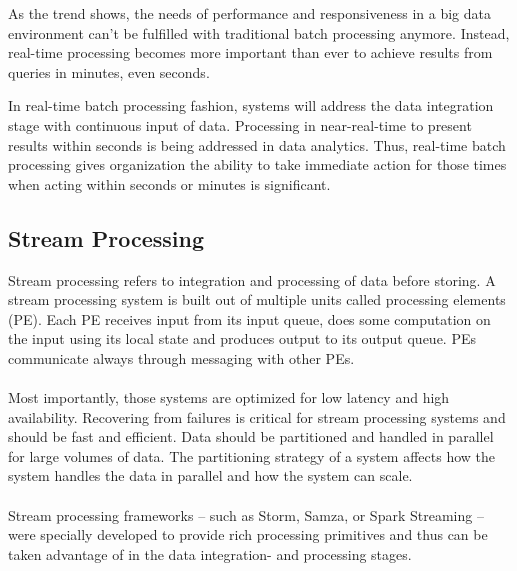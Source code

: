 As the trend shows, the needs of performance and responsiveness in a big data
environment can't be fulfilled with traditional batch processing anymore.
Instead, real-time processing becomes more important than ever to achieve
results from queries in minutes, even seconds.
\cite{bange2013big}

In real-time batch processing fashion, systems will address the data integration stage
with continuous input of data. Processing in near-real-time to present 
results within seconds is being addressed in data analytics. Thus,
real-time batch processing gives organization the ability to take immediate action
for those times when acting within seconds or minutes is significant.
\cite{PrpSvyOfDSPS}


\subsection{Stream Processing}
\label{intro-datastream-streamprocessing}
Stream processing refers to integration and processing of data before storing. 
A stream processing system is built out of multiple units called processing
elements (PE). Each PE receives input from its input queue, does some
computation on the input using its local state and produces output to its
output queue. PEs communicate always through messaging with other PEs. 
\\ \\
Most importantly, those systems are optimized for low latency and high
availability. Recovering from failures is critical for stream processing
systems and should be fast and efficient. 
Data should be partitioned and handled in parallel for large volumes of data. 
The partitioning strategy of a system  affects how the system
handles the data in parallel and how the system can scale. 
\cite{PrpSvyOfDSPS}
\\ \\
Stream processing frameworks -- such as Storm, Samza, or Spark
Streaming -- were specially developed to provide rich processing primitives and
thus can be taken advantage of in the data integration- and processing stages.


